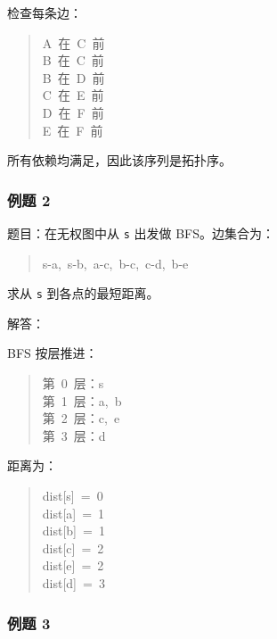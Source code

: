 \documentclass[UTF8,zihao=-4]{ctexart}
\begin{document}
检查每条边：

\begin{quote}
\small\ttfamily\raggedright
\relax A\ 在\ C\ 前\\
\relax B\ 在\ C\ 前\\
\relax B\ 在\ D\ 前\\
\relax C\ 在\ E\ 前\\
\relax D\ 在\ F\ 前\\
\relax E\ 在\ F\ 前\\
\end{quote}

所有依赖均满足，因此该序列是拓扑序。

\subsubsection*{例题 2}

题目：在无权图中从 \texttt{s} 出发做 BFS。边集合为：

\begin{quote}
\small\ttfamily\raggedright
\relax s-a,\ s-b,\ a-c,\ b-c,\ c-d,\ b-e\\
\end{quote}

求从 \texttt{s} 到各点的最短距离。

解答：

BFS 按层推进：

\begin{quote}
\small\ttfamily\raggedright
\relax 第\ 0\ 层：s\\
\relax 第\ 1\ 层：a,\ b\\
\relax 第\ 2\ 层：c,\ e\\
\relax 第\ 3\ 层：d\\
\end{quote}

距离为：

\begin{quote}
\small\ttfamily\raggedright
\relax dist[s]\ =\ 0\\
\relax dist[a]\ =\ 1\\
\relax dist[b]\ =\ 1\\
\relax dist[c]\ =\ 2\\
\relax dist[e]\ =\ 2\\
\relax dist[d]\ =\ 3\\
\end{quote}

\subsubsection*{例题 3}
\end{document}
